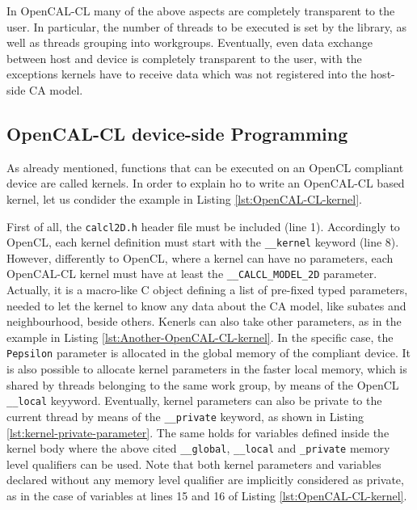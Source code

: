 In OpenCAL-CL many of the above aspects are completely transparent to
the user. In particular, the number of threads to be executed is set
by the library, as well as threads grouping into
workgroups. Eventually, even data exchange between host and device is
completely transparent to the user, with the exceptions kernels have
to receive data which was not registered into the host-side CA model.



\subsection{OpenCAL-CL device-side Programming}

As already mentioned, functions that can be executed on an OpenCL
compliant device are called kernels. In order to explain ho to write
an OpenCAL-CL based kernel, let us condider the example in Listing
\ref{lst:OpenCAL-CL-kernel}.

First of all, the \verb'calcl2D.h' header file must be included (line
1). Accordingly to OpenCL, each kernel definition must start with the
\verb'__kernel' keyword (line 8). However, differently to OpenCL,
where a kernel can have no parameters, each OpenCAL-CL kernel must
have at least the \verb'__CALCL_MODEL_2D' parameter. Actually, it is a
macro-like C object defining a list of pre-fixed typed parameters,
needed to let the kernel to know any data about the CA model, like
subates and neighbourhood, beside others. Kenerls can also take other
parameters, as in the example in Listing
\ref{lst:Another-OpenCAL-CL-kernel}. In the specific case, the
\verb'Pepsilon' parameter is allocated in the global memory of the
compliant device. It is also possible to allocate kernel parameters in
the faster local memory, which is shared by threads belonging to the
same work group, by means of the OpenCL \verb'__local'
keyyword. Eventually, kernel parameters can also be private to the
current thread by means of the \verb'__private' keyword, as shown in
Listing \ref{lst:kernel-private-parameter}. The same holds for
variables defined inside the kernel body where the above cited
\verb'__global', \verb'__local' and \verb'_private' memory level
qualifiers can be used. Note that both kernel parameters and variables
declared without any memory level qualifier are implicitly considered
as private, as in the case of variables at lines 15 and 16 of Listing
\ref{lst:OpenCAL-CL-kernel}.

